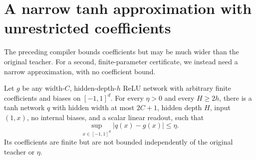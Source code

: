 \section{A narrow tanh approximation with unrestricted coefficients}
\label{sec:narrow-tanh-embedding}
The preceding compiler bounds coefficients but may be much wider than the original teacher. For a second, finite-parameter certificate, we instead need a narrow approximation, with no coefficient bound.

\begin{lemma}
\label{lem:narrow-tanh-embedding}
Let $g$ be any width-$C$, hidden-depth-$h$ ReLU network with arbitrary finite coefficients and biases on $[-1,1]^d$. For every $\eta>0$ and every $H\ge2h$, there is a tanh network $q$ with hidden width at most $2C+1$, hidden depth $H$, input $(1,x)$, no internal biases, and a scalar linear readout, such that
\[
 \sup_{x\in[-1,1]^d}|q(x)-g(x)|\le\eta.
\]
Its coefficients are finite but are not bounded independently of the original teacher or $\eta$.
\end{lemma}
